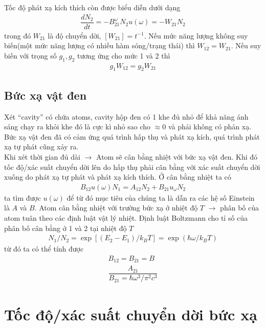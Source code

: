 \documentclass{report}
\newcommand{\q}[1]{``#1''}
\newcommand{\f}[2]{\dfrac{#1}{#2}}
\begin{document}
Tốc độ phát xạ kích thích còn được biểu diễn dưới dạng
\begin{gather}
	\f{dN_{2}}{dt} = - B_{21}^{\omega} N_{2} u(\omega) = - W_{21} N_{2}
\end{gather}
trong đó $W_{21}$ là độ chuyển dời, $\left[W_{21}\right] = t^{-1}$. Nếu mức năng lượng không suy biến(một mức năng lượng có nhiều hàm sóng/trạng thái) thì $W_{12} = W_{21}$. Nếu suy biến với trọng số $g_{1}, g_{2}$ tương ứng cho mức 1 và 2 thì
\begin{gather}
	g_{1} W_{12} = g_{2} W_{21}
\end{gather}
\subsection{Bức xạ vật đen}
Xét \q{cavity} có chứa atoms, cavity hộp đen có 1 khe đủ nhỏ để khả năng ánh sáng chạy ra khỏi khe đó là cực kì nhỏ sao cho $\approx 0$ và phải không có phản xạ. Bức xạ vật đen đã có cảm ứng quá trình hấp thụ và phát xạ kích, quá trình phát xạ tự phát cũng xảy ra. \\
Khi xét thời gian đủ dài $\rightarrow$ Atom sẽ cân bằng nhiệt với bức xạ vật đen. Khi đó tốc độ/xác suất chuyển dời lên do hấp thụ phải cân bằng với xác suất chuyển dời xuống do phát xạ tự phát và phát xạ kích thích. Ở cân bằng nhiệt ta có
\begin{gather}
	B_{12} u(\omega) N_{1} = A_{12} N_{2} + B_{21} u_{\omega} N_{2}
\end{gather}
ta tìm được $u(\omega)$ để từ đó mục tiêu của chúng ta là dẫn ra các hệ số Einstein là $A$ và $B$. Atom cân bằng nhiệt với trường bức xạ ở nhiệt độ $T$ $\rightarrow$ phân bố của atom tuân theo các định luật vật lý nhiệt. Định luật Boltzmann cho tỉ số của phân bố cân bằng ở 1 và 2 tại nhiệt độ $T$
\begin{gather}
	N_{1} / N_{2} = \exp[(E_{2} -  E_{1}) / k_{B} T] = \exp(\hbar \omega / k_{B} T)
\end{gather}
từ đó ta có thể tính được
\begin{gather}
	B_{12} = B_{21} = B\\
	\f{A_{21}}{B_{21} = \hbar \omega^{3} / \pi^{2} c^{3}}
\end{gather}
\section{Tốc độ/xác suất chuyển dời bức xạ}
\end{document}
